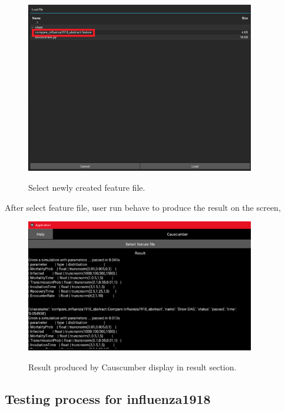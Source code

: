 \begin{figure}[H]
	\centering
	\includegraphics[width=10cm]{figures/influenzaTestProcess14.png}\\
	\caption{Select newly created feature file.}
	\label{fig:figure32}
\end{figure}
After select feature file, user run behave to produce the result on the screen,
\begin{figure}[H]
	\centering
	\includegraphics[width=10cm]{figures/influenzaTestProcess15.png}\\
	\caption{Result produced by Causcumber display in result section.}
	\label{fig:figure33}
\end{figure}

\subsection{Testing process for influenza1918}
